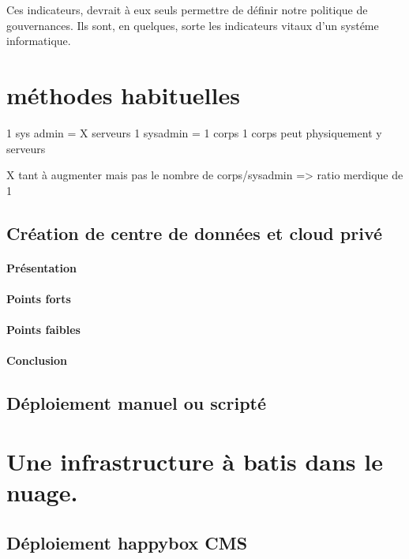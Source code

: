 \documentclass[11pt, a4paper ]{article}
\let\stdsection\section
\renewcommand\section{\newpage\stdsection}
\begin{document}
Ces indicateurs, devrait à eux seuls permettre de définir notre politique de gouvernances. Ils sont, en quelques, sorte les indicateurs vitaux d'un systéme informatique.

		\section{méthodes habituelles} %

1 sys admin = X serveurs
1 sysadmin = 1 corps
1 corps peut physiquement y serveurs

X tant à augmenter mais pas le nombre de corps/sysadmin => ratio merdique de 1


			\subsection{Création de centre de données et cloud privé}
\paragraph{Présentation}

\paragraph{Points forts}

\paragraph{Points faibles}

\paragraph{Conclusion}

			\subsection{Déploiement manuel ou scripté}

		\section{Une infrastructure à batis dans le nuage.}	 %

			\subsection{Déploiement happybox CMS}
\end{document}
